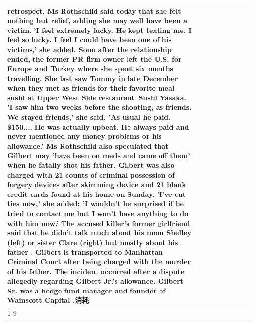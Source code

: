 \begin{table}[H]
\begin{tabular}{lllrlllll}
retrospect, Ms Rothschild said today that she felt nothing but relief, adding she may well have been a victim. 'I feel extremely lucky. He kept texting me. I feel so lucky. I feel I could have been one of his victims,' she added. Soon after the relationship ended, the former PR firm owner left the U.S. for Europe and Turkey where she spent six months  travelling. She last saw Tommy in late December when they met as friends for their favorite meal sushi at Upper West Side restaurant Sushi Yasaka. 'I saw him two weeks before the shooting, as friends. We stayed friends,' she said. 'As usual he paid. \$150.... He was actually upbeat. He always paid and never mentioned any money problems or his allowance.' Ms Rothschild also speculated that Gilbert may 'have been on meds and came off them' when he fatally shot his father. Gilbert was also charged with 21 counts of criminal possession of forgery devices after skimming device and 21 blank credit cards found at his home on Sunday. 'I've cut ties now,' she added: 'I wouldn’t be surprised if he tried to contact me but I won’t have anything to do with him now.' The accused killer's former girlfriend said that he didn't talk much about his mom Shelley (left) or sister Clare (right) but mostly about his father . Gilbert is transported to Manhattan Criminal Court  after being charged with the murder of his father. The incident occurred after a dispute allegedly regarding Gilbert Jr.'s allowance. Gilbert Sr. was a hedge fund manager and founder of Wainscott Capital .消耗 \\
\cline{1-9}

\end{tabular}
\end{table}

